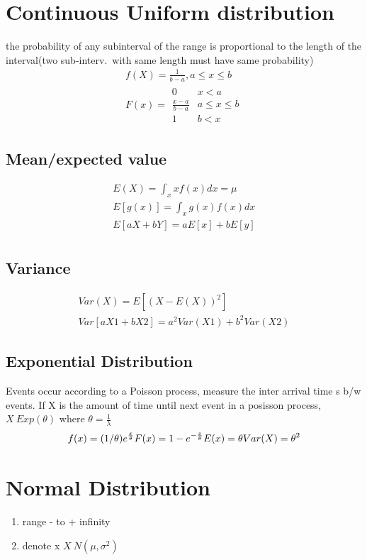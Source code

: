 \documentclass[11pt]{article}
\begin{document}
\section{Continuous Uniform distribution}
\par the probability of any subinterval of the range is proportional to the
length of the interval(two sub-interv.\ with same length must have same
probability)
\begin{align*}
  f(X) = \frac{1}{b-a}, a\le x\le b\\
  F(x) =
  \begin{array}{ll}
    0 & x < a
    \\
    \frac{x-a}{b-a} & a\le x \le b\\
    1 & b < x
  \end{array}
\end{align*}
\subsection{Mean/expected value}
\begin{align*}
  E(X)= \int_{x}xf(x)dx = \mu\\
  E[g(x)] = \int_{x}g(x)f(x)dx\\
  E[aX+bY] = aE[x] +bE[y]\\
\end{align*}
\subsection{Variance}
\begin{align*}
  Var(X) = E[(X-E(X))^2]\\
  Var [aX1+bX2] = a^2Var(X1)  + b^2Var(X2)
\end{align*}
\subsection{Exponential Distribution}
\par Events occur according to a Poisson process, measure the inter arrival
time s b/w events. If X is the amount of  time until next event in a posisson
process, $X~Exp(\theta)$ where $\theta = \frac{1}{\lambda}$
\begin{align*}
  f(x) = (1/\theta) e^{\-\frac{x}{\theta}}
  F(x) = 1 - e^{-\frac{x}{\theta}}
  E(x) = \theta
  Var(X) = \theta^2
\end{align*}
\section{Normal Distribution}
\begin{enumerate}
  \item range - to + infinity
  \item denote x $X~N(\mu, \sigma^2)$
\end{enumerate}
\end{document}

